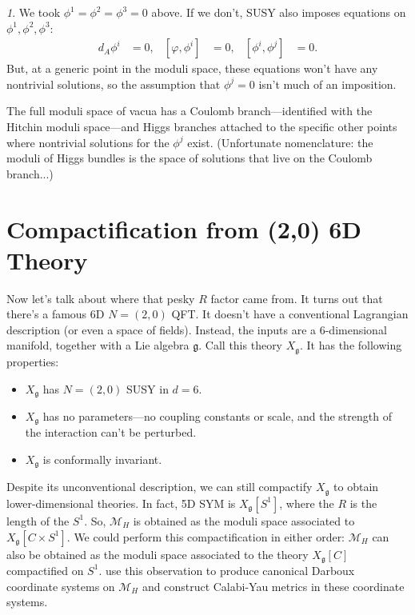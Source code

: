 \documentclass[oneside,english]{amsbook}
\numberwithin{section}{chapter}
\numberwithin{equation}{section}
\numberwithin{figure}{section}
\theoremstyle{plain}
\theoremstyle{definition}
\theoremstyle{remark}
\newtheorem*{rem*}{\protect\remarkname}
\theoremstyle{definition}
\theoremstyle{definition}
\theoremstyle{plain}
\providecommand{\remarkname}{Remark}
\begin{document}
\begin{rem*}
We took $\phi^{1}=\phi^{2}=\phi^{3}=0$ above. If we don't, SUSY also
imposes equations on $\phi^{1},\phi^{2},\phi^{3}$: 
\begin{align*}
d_{A}\phi^{i} & =0, & \left[\varphi,\phi^{i}\right] & =0, & \left[\phi^{i},\phi^{j}\right] & =0.
\end{align*}
But, at a generic point in the moduli space, these equations won't
have any nontrivial solutions, so the assumption that $\phi^{j}=0$
isn't much of an imposition. 
\end{rem*}
The full moduli space of vacua has a Coulomb branch---identified with
the Hitchin moduli space---and Higgs branches attached to the specific
other points where nontrivial solutions for the $\phi^{j}$ exist.
(Unfortunate nomenclature: the moduli of Higgs bundles is the space
of solutions that live on the Coulomb branch...)


\section{Compactification from (2,0) 6D Theory}

Now let's talk about where that pesky $R$ factor came from. It turns
out that there's a famous 6D $N=\left(2,0\right)$ QFT. It doesn't
have a conventional Lagrangian description (or even a space of fields).
Instead, the inputs are a 6-dimensional manifold, together with a
Lie algebra $\mathfrak{g}$. Call this theory $X_{\mathfrak{g}}$.
It has the following properties:
\begin{itemize}
\item $X_{\mathfrak{g}}$ has $N=\left(2,0\right)$ SUSY in $d=6$. 
\item $X_{\mathfrak{g}}$ has no parameters---no coupling constants or scale,
and the strength of the interaction can't be perturbed.
\item $X_{\mathfrak{g}}$ is conformally invariant. 
\end{itemize}
Despite its unconventional description, we can still compactify $X_{\mathfrak{g}}$
to obtain lower-dimensional theories. In fact, 5D SYM is $X_{\mathfrak{g}}\left[S^{1}\right]$,
where the $R$ is the length of the $S^{1}$. So, $\mathcal{M}_{H}$
is obtained as the moduli space associated to $X_{\mathfrak{g}}\left[C\times S^{1}\right]$.
We could perform this compactification in either order: $\mathcal{M}_{H}$
can also be obtained as the moduli space associated to the theory
$X_{\mathfrak{g}}\left[C\right]$ compactified on $S^{1}$. \cite{GMN}
use this observation to produce canonical Darboux coordinate systems
on $\mathcal{M}_{H}$ and construct Calabi-Yau metrics in these coordinate
systems. 
\end{document}
